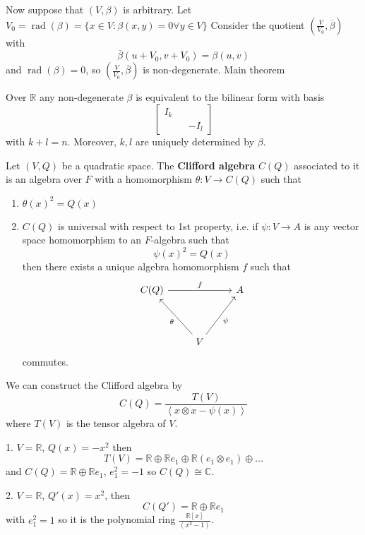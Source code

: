 \documentclass[11pt,a4paper]{scrarticle}
\theoremstyle{definition}
\theoremstyle{greenbox}
\newcommand{\R}{\mathbb{R}}
\newcommand{\C}{\mathbb{C}}
\begin{document}
Now suppose that $ (V, \beta) $ is arbitrary. Let $ V_{0} = \operatorname{rad}(\beta) = \{x \in V : \beta(x,y) = 0 \forall y \in V\} $
Consider the quotient $ (\frac{V}{V_{0}}, \overline{\beta}) $ with 
\[ \overline{\beta}(u+V_{0},v+V_{0}) = \beta(u,v) \]
and $ \operatorname{rad}(\beta) = 0 $, so $ (\frac{V}{V_{0}}, \overline{\beta}) $ is non-degenerate. Main theorem \begin{thm}
    Over $ \R $ any non-degenerate $ \beta $ is equivalent to the bilinear form with basis 
    \[ \begin{bmatrix}
        I_{k} && \\
        && - I_{l}
    \end{bmatrix} \]
 with $ k+l = n$. Moreover, $ k,l $ are uniquely determined by $ \beta $.
\end{thm}

\begin{defn}
    Let $ (V, Q) $ be a quadratic space. The \textbf{Clifford algebra} $ C(Q) $ associated to it is an algebra over $ F $ with a homomorphism $ \theta : V \to C(Q) $ such that
\begin{enumerate}
    \item $ \theta(x)^{2} = Q(x) $ 
    \item $ C(Q) $ is universal with respect to 1st property, i.e. if $ \psi : V \to A $ is any vector space homomorphism to an $ F $-algebra such that 
    \[ \psi(x)^{2} = Q(x) \]
    then there exists a unique algebra homomorphism $ f $ such that %
    \[\begin{tikzcd}
        {C(Q)} && A \\
        \\
        & V
        \arrow["\theta", from=3-2, to=1-1]
        \arrow["\psi"', from=3-2, to=1-3]
        \arrow["f", from=1-1, to=1-3]
    \end{tikzcd}\]
    commutes. 
\end{enumerate}
\end{defn}
We can construct the Clifford algebra by 
\[ C(Q) = \frac{T(V)}{\left< x \otimes x - \psi(x) \right>} \]
where $ T(V) $ is the tensor algebra of $ V $. 

\begin{example}
    1. $ V = \R $, $ Q(x) = -x^{2} $ then 
    \[ T(V) =\R \oplus \R e_{1} \oplus \R( e_{1} \otimes e_{1}) \oplus \dots    \]
    and $ C(Q) = \R \oplus \R e_{1} $, $ e_{1}^{2} = -1 $ so $ C(Q) \cong \C $. 

    2. $ V = \R $, $ Q'(x) = x^{2} $, then 
    \[ C(Q') = \R \oplus \R e_{1} \]
    with $ e_{1}^{2} = 1 $ so it is the polynomial ring $ \frac{\R[x]}{(x^{2}-1)} $. 
    
\end{example}
\end{document}
